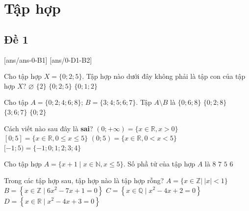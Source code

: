 \section{Tập hợp}

\subsection{Đề 1}
[ans/ans-0-B1]
\caulc
{}[ans/0-D1-B2]
\begin{ex} %
	Cho tập hợp $X=\{0 ; 2 ; 5\}$. Tập hợp nào dưới đây không phải là tập con của tập hợp $X$?
	\choice
	{$\varnothing$}
	{$\{2\}$}
	{$\{0 ; 2 ; 5\}$}
	{\True  $\{0 ; 1 ; 2\}$}
\end{ex}
\begin{ex}%
	Cho tập $A=\{0 ; 2 ; 4 ; 6 ; 8\}$; $B=\{3 ; 4 ; 5 ; 6 ; 7\}$. Tập $A \setminus B$ là
	\choice
	{$\{0 ; 6 ; 8\}$}
	{\True $\{0 ; 2 ; 8\}$}
	{$\{3 ; 6 ; 7\}$}
	{$\{0 ; 2\}$}
\end{ex}
\begin{ex}%
	Cách viết nào sau đây là \textbf{sai}?
	\choice
	{$(0 ;+\infty)=\{x \in \mathbb{R}, x>0\}$}
	{$[0 ; 5]=\{x \in \mathbb{R}, 0 \leqslant x \leqslant 5\}$}
	{$(0 ; 5)=\{x \in \mathbb{R}, 0<x<5\}$}
	{\True $[-1 ; 5)=\{-1 ; 0 ; 1 ; 2 ; 3 ; 4\}$}
	\loigiai{
		Vì $[-1 ; 5)=\{x \in \mathbb{R} \mid-1 \leqslant x<5\}$ nên cách viết sau là sai: \lq\lq$[-1 ; 5)=\{-1 ; 0 ; 1 ; 2 ; 3 ; 4\}$\rq\rq.
	}
\end{ex}
\begin{ex}%
	Cho tập hợp $A=\{x+1 \mid x \in \mathbb{N}, x \leq 5\}$. Số phầ tử của tập hợp $A$ là
	\choice
	{$8$}
	{$7$}
	{$5$}
	{\True $6$}
\end{ex}
\begin{ex}%
	Trong các tập hợp sau,  tập hợp nào là tập hợp rỗng?
	\choice
	{$A=\{x \in \mathbb{Z}|~| x|<1\}$}
	{$B=\left\{x \in \mathbb{Z} \mid 6 x^2-7 x+1=0\right\}$}
	{\True $C=\left\{x \in \mathbb{Q} \mid x^2-4 x+2=0\right\}$}
	{$D=\left\{x \in \mathbb{R} \mid x^2-4 x+3=0\right\}$}
\end{ex}
